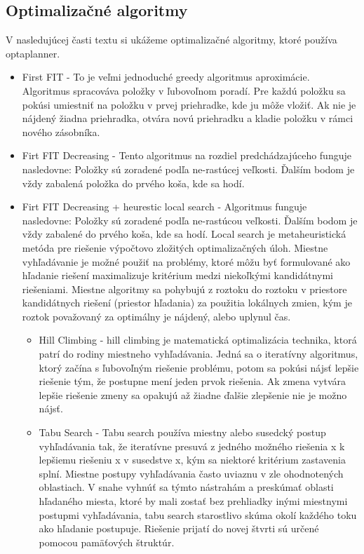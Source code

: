 \subsection{Optimalizačné algoritmy}
V nasledujúcej časti textu si ukážeme optimalizačné algoritmy, ktoré používa optaplanner.
\begin{itemize}
\item First FIT - To je veľmi jednoduché greedy algoritmus aproximácie. Algoritmus spracováva položky v ľubovoľnom poradí. Pre každú položku sa pokúsi umiestniť na položku v prvej priehradke, kde ju môže vložiť. Ak nie je nájdený žiadna priehradka, otvára novú priehradku a kladie položku v rámci nového zásobníka.

\item Firt FIT Decreasing - Tento algoritmus na rozdiel predchádzajúceho funguje nasledovne: Položky sú zoradené podľa ne-rastúcej veľkosti. Ďalším bodom je vždy zabalená položka do prvého koša, kde sa hodí.
\item Firt FIT Decreasing + heurestic local search -  Algoritmus funguje nasledovne: Položky sú zoradené podľa ne-rastúcou veľkosti. Ďalším bodom je vždy zabalené do prvého koša, kde sa hodí. Local search  je metaheuristická metóda pre riešenie výpočtovo zložitých optimalizačných úloh. Miestne vyhľadávanie je možné použiť na problémy, ktoré môžu byť formulované ako hľadanie riešení maximalizuje kritérium medzi niekoľkými kandidátnymi riešeniami. Miestne algoritmy sa pohybujú z roztoku do roztoku v priestore kandidátnych riešení (priestor hľadania) za použitia lokálnych zmien, kým je roztok považovaný za optimálny je nájdený, alebo uplynul čas.

\begin{itemize}
\item Hill Climbing - hill climbing je matematická optimalizácia technika, ktorá patrí do rodiny miestneho vyhľadávania. Jedná sa o iteratívny algoritmus, ktorý začína s ľubovoľným riešenie problému, potom sa pokúsi nájsť lepšie riešenie tým, že postupne mení jeden prvok riešenia. Ak zmena vytvára lepšie riešenie zmeny sa opakujú až žiadne ďalšie zlepšenie nie je možno nájsť.\cite{algobook}




\item Tabu Search - Tabu search používa miestny alebo susedcký postup vyhľadávania tak, že iteratívne presuvá z jedného možného riešenia x k lepšiemu riešeniu x  v susedstve x, kým sa niektoré kritérium zastavenia splní. Miestne postupy vyhľadávania často uviaznu v zle ohodnotených oblastiach. V snahe vyhnúť sa týmto nástrahám a preskúmať oblasti hľadaného miesta, ktoré by mali zostať bez prehliadky inými miestnymi postupmi vyhľadávania, tabu search starostlivo skúma okolí každého toku ako hľadanie postupuje. Riešenie prijatí do novej štvrti sú určené pomocou pamäťových štruktúr.


\end{itemize}
\end{itemize}
